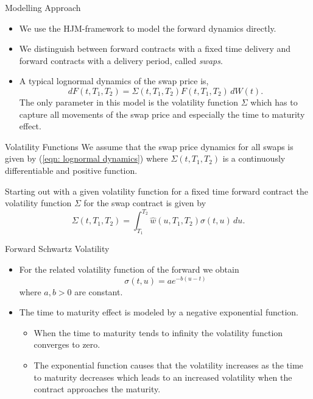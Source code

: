 {Modelling Approach}
\begin{itemize}
\item<1-> We use the HJM-framework to model the forward dynamics directly.
\item<2-> We distinguish between forward contracts with a fixed time delivery and forward contracts with a delivery period, called \emph{swaps}.
\item<3-> A typical lognormal dynamics of the swap price is,
\begin{equation}
dF(t,T_1,T_2)=\Sigma(t,T_1,T_2)F(t,T_1,T_2)\, dW(t). \label{eqn: lognormal dynamics}
\end{equation}
The only parameter in this model is the volatility function $\Sigma$ which has to capture all movements of the swap price and especially the time to maturity effect.

\end{itemize}

{Volatility Functions}
We assume that the swap price dynamics for all swaps is given by (\ref{eqn: lognormal dynamics})
where $\Sigma(t,T_1,T_2)$ is a continuously differentiable and positive function.

Starting out with a given volatility function for a fixed time forward contract the volatility function $\Sigma$ for the swap contract is given by
\begin{equation}
\Sigma(t,T_1,T_2)=\int_{T_1}^{T_2} \hat{w}(u,T_1,T_2) \sigma(t,u) \, du. \label{eqn: swap volatility creation}
\end{equation}

{Forward Schwartz Volatility}
\begin{itemize}
\item<1-> For the related volatility function of the forward we obtain
\begin{equation}\label{vol-schwartz}
\sigma(t,u)=a e^{-b(u-t)}
\end{equation}
where $a,b >0 $ are constant.
\item<2->
The time to maturity effect is modeled by a negative exponential function.
\begin{itemize}
\item When the time to maturity tends to infinity the volatility function converges to zero.
\item The exponential function causes that the volatility increases as the time to maturity decreases which leads to an increased volatility when the contract approaches the maturity.
\end{itemize}
\end{itemize}

